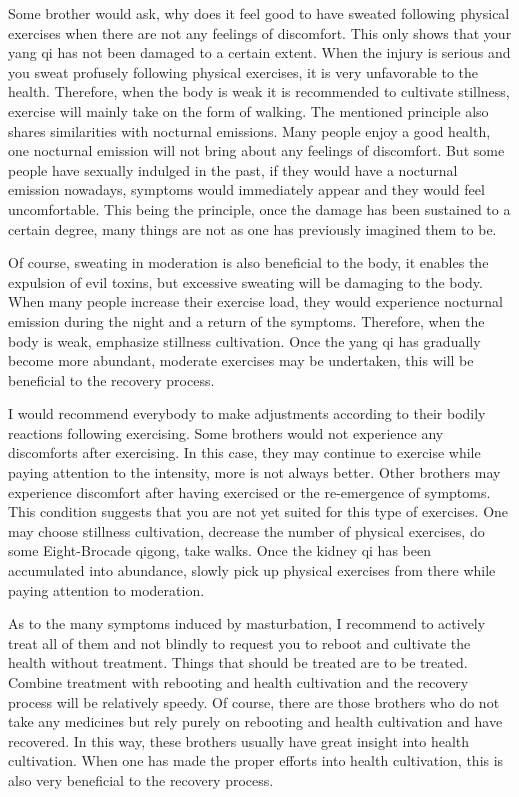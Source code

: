 \documentclass[
]{book}
\begin{document}
Some brother would ask, why does it feel good to have sweated following physical exercises when there are not any feelings of discomfort. This only shows that your yang qi has not been damaged to a certain extent. When the injury is serious and you sweat profusely following physical exercises, it is very unfavorable to the health. Therefore, when the body is weak it is recommended to cultivate stillness, exercise will mainly take on the form of walking. The mentioned principle also shares similarities with nocturnal emissions. Many people enjoy a good health, one nocturnal emission will not bring about any feelings of discomfort. But some people have sexually indulged in the past, if they would have a nocturnal emission nowadays, symptoms would immediately appear and they would feel uncomfortable. This being the principle, once the damage has been sustained to a certain degree, many things are not as one has previously imagined them to be.

Of course, sweating in moderation is also beneficial to the body, it enables the expulsion of evil toxins, but excessive sweating will be damaging to the body. When many people increase their exercise load, they would experience nocturnal emission during the night and a return of the symptoms. Therefore, when the body is weak, emphasize stillness cultivation. Once the yang qi has gradually become more abundant, moderate exercises may be undertaken, this will be beneficial to the recovery process.

I would recommend everybody to make adjustments according to their bodily reactions following exercising. Some brothers would not experience any discomforts after exercising. In this case, they may continue to exercise while paying attention to the intensity, more is not always better. Other brothers may experience discomfort after having exercised or the re-emergence of symptoms. This condition suggests that you are not yet suited for this type of exercises. One may choose stillness cultivation, decrease the number of physical exercises, do some Eight-Brocade qigong, take walks. Once the kidney qi has been accumulated into abundance, slowly pick up physical exercises from there while paying attention to moderation.

As to the many symptoms induced by masturbation, I recommend to actively treat all of them and not blindly to request you to reboot and cultivate the health without treatment. Things that should be treated are to be treated. Combine treatment with rebooting and health cultivation and the recovery process will be relatively speedy. Of course, there are those brothers who do not take any medicines but rely purely on rebooting and health cultivation and have recovered. In this way, these brothers usually have great insight into health cultivation. When one has made the proper efforts into health cultivation, this is also very beneficial to the recovery process.
\end{document}
